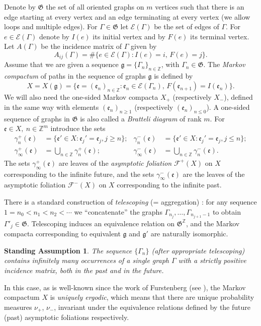 \documentclass[JEP,XML,SOM,Unicode]{cedram}
\let\mathcal\mathscr
\newcommand{\sep}{:}
\theoremstyle{plain}
\newtheorem*{standass}{Standing Assumption}
\theoremstyle{definition}
\let\gam\gamma
\let\Gam\Gamma
\newcommand\ef{\mathfrak{e}}
\newcommand\gf{\mathfrak{g}}
\newcommand\Frg{\mathfrak{G}}
\newcommand{\Ek}{\mathcal{E}}
\newcommand{\Fk}{\mathcal{F}}
\newcommand{\Z}{\mathbb{Z}}
\begin{document}
Denote by $\Frg$ the set of all oriented graphs on $m$ vertices such that there is an edge starting at every vertex and an edge terminating at every vertex (we allow loops and multiple edges).
For $\Gam\in \Frg$ let $\Ek(\Gam)$ be the set of edges of $\Gam$. For $e\in \Ek(\Gam)$ denote by $I(e)$ its initial vertex and by $F(e)$ its terminal vertex. Let $A(\Gam)$ be the incidence matrix of $\Gam$ given by
\[
A_{ij}(\Gam) = \#\{e\in \Ek(\Gam)\sep I(e) = i,\,F(e) = j\}.
\]
Assume that we are given a sequence $\gf = \{\Gam_n\}_{n\in \Z}$, with $\Gam_n \in \Frg$. The \emph{Markov compactum} of paths in the sequence of graphs $\gf$ is defined by
\[
X = X(\gf) = \{\ef = (\ef_n)_{n\in \Z}\sep \ef_n \in \Ek(\Gam_n),\, F(\ef_{n+1}) = I(\ef_n)\}.
\]
We will also need the one-sided Markov compacta $X_+$ (respectively $X_-$), defined in the same way with elements $(\ef_n)_{n\ge 1}$ (respectively $(\ef_n)_{n\le 0}$). A one-sided sequence of graphs in $\Frg$ is also called a \emph{Bratteli diagram} of rank $m$.
For $\ef\in X,\ n\in \Z^m$ introduce the sets
\begin{align*}
\gam_n^+(\ef) &= \{\ef'\in X\sep \ef_j'=\ef_j, j\ge n\};& \gam_n^-(\ef) &= \{\ef'\in X\sep \ef_j'=\ef_j, j\le n\};\\
\gam_\infty^+(\ef) &= \bigcup_{n\in \Z} \gam_n^+(\ef);& \gam_\infty^-(\ef) &= \bigcup_{n\in \Z} \gam_n^-(\ef).
\end{align*}
The sets $\gam_\infty^+(\ef)$ are leaves of the \emph{asymptotic foliation} $\Fk^+(X)$ on $X$ corresponding to the infinite future, and the sets $\gam_\infty^-(\ef)$
are the leaves of the asymptotic foliation $\Fk^-(X)$ on $X$ corresponding to the infinite past.

There is a standard construction of \emph{telescoping} (= aggregation) \cite[2.4]{Buf-umn}: for any sequence $1=n_0<n_1 < n_2< \cdots$ we ``concatenate'' the graphs
$\Gam_{n_j},\ldots, \Gam_{n_{j+1}-1}$ to obtain $\Gam'_j\in \Frg$. Telescoping induces an equivalence relation on $\Frg^\Z$, and the Markov compacta corresponding to equivalent $\gf$ and $\gf'$ are naturally isomorphic.

\begin{standass}
The sequence $\{\Gam_n\}$ (after appropriate
telescoping) contains infinitely many occurrences of a single graph $\Gam$ with a strictly positive incidence matrix, both in the past and in the future.
\end{standass}

In this case, as is
well-known since the work of Furstenberg (see \eg \cite[(16.13)]{furst}), the
Markov compactum $X$ is \emph{uniquely ergodic}, which means that there are unique probability measures $\nu_+$, $\nu_-$, invariant under the equivalence relations defined by the future (past) asymptotic foliations respectively.
\end{document}
